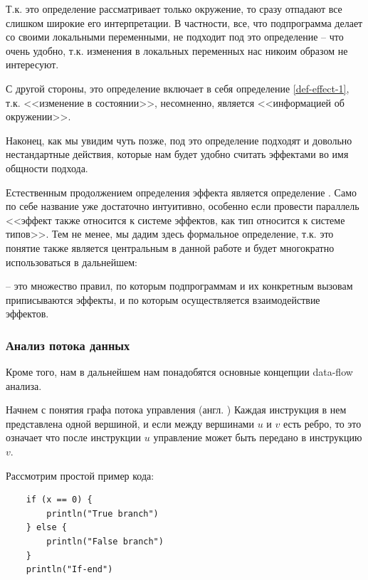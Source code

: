Т.к. это определение рассматривает только окружение, то сразу отпадают все слишком широкие его интерпретации. В частности, все, что подпрограмма делает со своими локальными переменными, не подходит под это определение -- что очень удобно, т.к. изменения в локальных переменных нас никоим образом не интересуют.

С другой стороны, это определение включает в себя определение \ref{def-effect-1}, т.к. <<изменение в состоянии>>, несомненно, является <<информацией об окружении>>.

Наконец, как мы увидим чуть позже, под это определение подходят и довольно нестандартные действия, которые нам будет удобно считать эффектами во имя общности подхода.


\bigskip

Естественным продолжением определения эффекта является определение . Само по себе название уже достаточно интуитивно, особенно если провести параллель <<эффект также относится к системе эффектов, как тип относится к системе типов>>. Тем не менее, мы дадим здесь формальное определение, т.к. это понятие также является центральным в данной работе и будет многократно использоваться в дальнейшем:

\begin{definition}
     -- это множество правил, по которым подпрограммам и их конкретным вызовам приписываются эффекты, и по которым осуществляется взаимодействие эффектов.
\end{definition}




\subsubsection{Анализ потока данных}

Кроме того, нам в дальнейшем нам понадобятся основные концепции data-flow анализа.

Начнем с понятия графа потока управления (англ. ) Каждая инструкция в нем представлена одной вершиной, и если между вершинами $u$ и $v$ есть ребро, то это означает что после инструкции $u$ управление может быть передано 
в инструкцию $v$. 

Рассмотрим простой пример кода:

\begin{verbatim}
    if (x == 0) {
        println("True branch")
    } else {
        println("False branch")
    }
    println("If-end")    
\end{verbatim}


